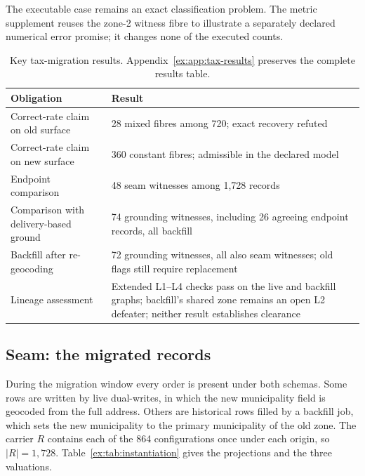 \documentclass[smallextended,envcountsect,envcountsame,natbib]{svjour3}
\begin{document}
The executable case remains an exact classification problem. The metric supplement reuses the zone-2 witness fibre to illustrate a separately declared numerical error promise; it changes none of the executed counts.

\begin{table}[htbp]
\centering\small
\caption{Key tax-migration results. Appendix~\ref{ex:app:tax-results} preserves the complete results table.}
\label{ex:tab:case-results}
\begin{tabularx}{\textwidth}{@{}p{4.7cm}L@{}}
\toprule
Obligation & Result \\
\midrule
Correct-rate claim on old surface & 28 mixed fibres among 720; exact recovery refuted \\
Correct-rate claim on new surface & 360 constant fibres; admissible in the declared model \\
Endpoint comparison & 48 seam witnesses among 1,728 records \\
Comparison with delivery-based ground & 74 grounding witnesses, including 26 agreeing endpoint records, all backfill \\
Backfill after re-geocoding & 72 grounding witnesses, all also seam witnesses; old flags still require replacement \\
Lineage assessment & Extended L1--L4 checks pass on the live and backfill graphs; backfill's shared zone remains an open L2 defeater; neither result establishes clearance \\
\bottomrule
\end{tabularx}
\end{table}

\subsection{Seam: the migrated records}

During the migration window every order is present under both schemas. Some rows are written by live dual-writes, in which the new municipality field is geocoded from the full address. Others are historical rows filled by a backfill job, which sets the new municipality to the primary municipality of the old zone. The carrier $R$ contains each of the 864 configurations once under each origin, so $|R|=1{,}728$. Table~\ref{ex:tab:instantiation} gives the projections and the three valuations.
\end{document}
